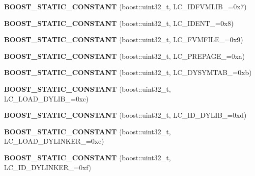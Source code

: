 \begin{DoxyCompactItemize}
{\bfseries B\+O\+O\+S\+T\+\_\+\+S\+T\+A\+T\+I\+C\+\_\+\+C\+O\+N\+S\+T\+A\+NT} (boost\+::uint32\+\_\+t, L\+C\+\_\+\+I\+D\+F\+V\+M\+L\+I\+B\+\_\+=0x7)
\item 
\mbox{\label{a01552_a28741faf365266ae924d26b3212c4207}} 
{\bfseries B\+O\+O\+S\+T\+\_\+\+S\+T\+A\+T\+I\+C\+\_\+\+C\+O\+N\+S\+T\+A\+NT} (boost\+::uint32\+\_\+t, L\+C\+\_\+\+I\+D\+E\+N\+T\+\_\+=0x8)
\item 
\mbox{\label{a01552_abbdea1e3fca227593cc23bef87a2c215}} 
{\bfseries B\+O\+O\+S\+T\+\_\+\+S\+T\+A\+T\+I\+C\+\_\+\+C\+O\+N\+S\+T\+A\+NT} (boost\+::uint32\+\_\+t, L\+C\+\_\+\+F\+V\+M\+F\+I\+L\+E\+\_\+=0x9)
\item 
\mbox{\label{a01552_a0114e34cf3b049abcf673cc4de66a4a0}} 
{\bfseries B\+O\+O\+S\+T\+\_\+\+S\+T\+A\+T\+I\+C\+\_\+\+C\+O\+N\+S\+T\+A\+NT} (boost\+::uint32\+\_\+t, L\+C\+\_\+\+P\+R\+E\+P\+A\+G\+E\+\_\+=0xa)
\item 
\mbox{\label{a01552_a3d1aa782247ff950063e7a5de7a71866}} 
{\bfseries B\+O\+O\+S\+T\+\_\+\+S\+T\+A\+T\+I\+C\+\_\+\+C\+O\+N\+S\+T\+A\+NT} (boost\+::uint32\+\_\+t, L\+C\+\_\+\+D\+Y\+S\+Y\+M\+T\+A\+B\+\_\+=0xb)
\item 
\mbox{\label{a01552_a3301ef9bdc0d879f571c8f2cd8d4d58e}} 
{\bfseries B\+O\+O\+S\+T\+\_\+\+S\+T\+A\+T\+I\+C\+\_\+\+C\+O\+N\+S\+T\+A\+NT} (boost\+::uint32\+\_\+t, L\+C\+\_\+\+L\+O\+A\+D\+\_\+\+D\+Y\+L\+I\+B\+\_\+=0xc)
\item 
\mbox{\label{a01552_ad845836550a5fab99f808b57c8add154}} 
{\bfseries B\+O\+O\+S\+T\+\_\+\+S\+T\+A\+T\+I\+C\+\_\+\+C\+O\+N\+S\+T\+A\+NT} (boost\+::uint32\+\_\+t, L\+C\+\_\+\+I\+D\+\_\+\+D\+Y\+L\+I\+B\+\_\+=0xd)
\item 
\mbox{\label{a01552_a23627ff05ca189c03781a23a55885457}} 
{\bfseries B\+O\+O\+S\+T\+\_\+\+S\+T\+A\+T\+I\+C\+\_\+\+C\+O\+N\+S\+T\+A\+NT} (boost\+::uint32\+\_\+t, L\+C\+\_\+\+L\+O\+A\+D\+\_\+\+D\+Y\+L\+I\+N\+K\+E\+R\+\_\+=0xe)
\item 
\mbox{\label{a01552_ae32900dd094adadbbceb64a0342aad37}} 
{\bfseries B\+O\+O\+S\+T\+\_\+\+S\+T\+A\+T\+I\+C\+\_\+\+C\+O\+N\+S\+T\+A\+NT} (boost\+::uint32\+\_\+t, L\+C\+\_\+\+I\+D\+\_\+\+D\+Y\+L\+I\+N\+K\+E\+R\+\_\+=0xf)

\end{DoxyCompactItemize}
